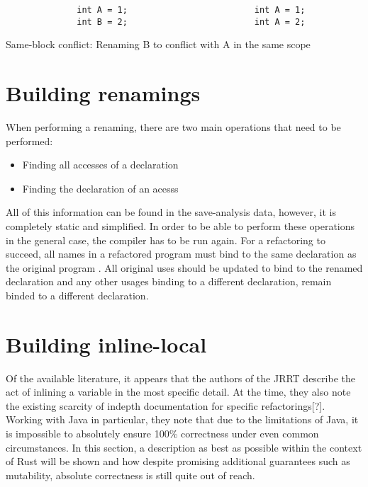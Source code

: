 \begin{fig}[H]
\begin{verbatim}
              int A = 1;                         int A = 1;
              int B = 2;                         int A = 2;
\end{verbatim}
\caption{Same-block conflict: Renaming B to conflict with A in the same scope}
\label{Fig:same}
\end{fig}


\section{Building renamings}\label{S:br}
When performing a renaming, there are two main operations that need to be performed:
\begin{itemize}
\item Finding all accesses of a declaration
\item Finding the declaration of an acesss
\end{itemize}


All of this information can be found in the save-analysis data, however, it is completely static and simplified. In order to be able to perform these operations in the general case, the compiler has to be run again. For a refactoring to succeed, all names in a refactored program must bind to the same declaration as the original program \cite{schafer2010specification}. All original uses should be updated to bind to the renamed declaration and any other usages binding to a different declaration, remain binded to a different declaration.

\section{Building inline-local}\label{S:buildIL}
Of the available literature, it appears that the authors of the JRRT describe the act of inlining a variable in the most specific detail. At the time, they also note the existing scarcity of indepth documentation for specific refactorings[?]. Working with Java in particular, they note that due to the limitations of Java, it is impossible to absolutely ensure 100\% correctness under even common circumstances. In this section, a description as best as possible within the context of Rust will be shown and how despite promising additional guarantees such as mutability, absolute correctness is still quite out of reach.

